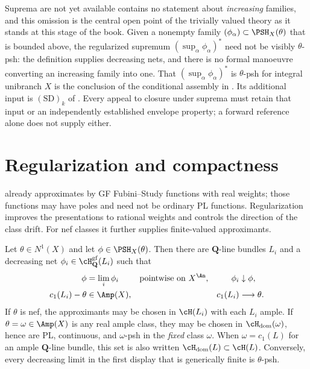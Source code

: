 \begin{warning}{Suprema are not yet available}
 contains no statement about \emph{increasing}
families, and this omission is the central open point of the trivially
valued theory as it stands at this stage of the book.  Given a nonempty
family $(\phi_\alpha)\subset\PSH_X(\theta)$ that is bounded above, the
regularized supremum $(\sup_\alpha\phi_\alpha)^*$ need not be visibly
$\theta$-psh: the definition supplies decreasing nets, and there is no
formal manoeuvre converting an increasing family into one.  That
$(\sup_\alpha\phi_\alpha)^*$ is $\theta$-psh for integral unibranch $X$
is the conclusion of the conditional assembly in
. Its additional input is
$\mathrm{(SD)}_k$ of . Every appeal to
closure under suprema must retain that input or an independently established
envelope property; a forward reference alone does not supply either.
\end{warning}

\section{Regularization and compactness}
\label{sec:ch34-compactness}

 already approximates by GF Fubini--Study functions
with real weights; those functions may have poles and need not be
ordinary PL functions.  Regularization improves the presentations to
rational weights and controls the direction of the class drift.
For nef classes it further supplies finite-valued approximants.

\begin{theorem}
\label{thm:ch34-fs-regularization}
Let $\theta\in N^1(X)$ and let $\phi\in\PSH_X(\theta)$.  Then there are
$\mathbf Q$-line bundles $L_i$ and a decreasing net
$\phi_i\in\cH^{\mathrm{gf}}_{\mathbf Q}(L_i)$ such that
\begin{equation}
\label{eq:bj-psh-regularization}
 \begin{aligned}
  \phi&=\lim_i\phi_i &&\text{pointwise on }X^{\An},
       &\phi_i&\downarrow\phi,\\
  c_1(L_i)-\theta&\in\Amp(X),
       &&&c_1(L_i)&\longrightarrow\theta .
 \end{aligned}
\end{equation}
If $\theta$ is nef, the approximants may be chosen in $\cH(L_i)$ with
each $L_i$ ample.  If $\theta=\omega\in\Amp(X)$ is any real ample
class, they may be chosen in $\cH_{\mathrm{dom}}(\omega)$, hence are PL,
continuous, and $\omega$-psh in the \emph{fixed} class $\omega$.  When
$\omega=c_1(L)$ for an ample $\mathbf Q$-line bundle, this set is also
written $\cH_{\mathrm{dom}}(L)\subset\cH(L)$.  Conversely, every
decreasing limit in the first display that is generically finite is
$\theta$-psh.
\end{theorem}

